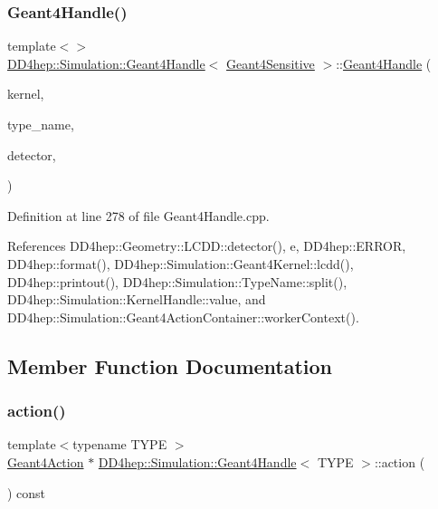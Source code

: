 \subsubsection{\texorpdfstring{Geant4\+Handle()}{Geant4Handle()}\hspace{0.1cm}{\footnotesize\ttfamily [20/20]}}
{\footnotesize\ttfamily template$<$$>$ \\
\hyperlink{class_d_d4hep_1_1_simulation_1_1_geant4_handle}{D\+D4hep\+::\+Simulation\+::\+Geant4\+Handle}$<$ \hyperlink{class_d_d4hep_1_1_simulation_1_1_geant4_sensitive}{Geant4\+Sensitive} $>$\+::\hyperlink{class_d_d4hep_1_1_simulation_1_1_geant4_handle}{Geant4\+Handle} (\begin{DoxyParamCaption}\item[{\hyperlink{class_d_d4hep_1_1_simulation_1_1_geant4_kernel}{Geant4\+Kernel} \&}]{kernel,  }\item[{const string \&}]{type\+\_\+name,  }\item[{const string \&}]{detector,  }\item[{bool}]{ }\end{DoxyParamCaption})}



Definition at line 278 of file Geant4\+Handle.\+cpp.



References D\+D4hep\+::\+Geometry\+::\+L\+C\+D\+D\+::detector(), e, D\+D4hep\+::\+E\+R\+R\+OR, D\+D4hep\+::format(), D\+D4hep\+::\+Simulation\+::\+Geant4\+Kernel\+::lcdd(), D\+D4hep\+::printout(), D\+D4hep\+::\+Simulation\+::\+Type\+Name\+::split(), D\+D4hep\+::\+Simulation\+::\+Kernel\+Handle\+::value, and D\+D4hep\+::\+Simulation\+::\+Geant4\+Action\+Container\+::worker\+Context().



\subsection{Member Function Documentation}
\hypertarget{class_d_d4hep_1_1_simulation_1_1_geant4_handle_a838155d5c4210bd0878ba77b128e6104}{}\label{class_d_d4hep_1_1_simulation_1_1_geant4_handle_a838155d5c4210bd0878ba77b128e6104} 
\subsubsection{\texorpdfstring{action()}{action()}}
{\footnotesize\ttfamily template$<$typename T\+Y\+PE $>$ \\
\hyperlink{class_d_d4hep_1_1_simulation_1_1_geant4_action}{Geant4\+Action} $\ast$ \hyperlink{class_d_d4hep_1_1_simulation_1_1_geant4_handle}{D\+D4hep\+::\+Simulation\+::\+Geant4\+Handle}$<$ T\+Y\+PE $>$\+::action (\begin{DoxyParamCaption}{ }\end{DoxyParamCaption}) const}




